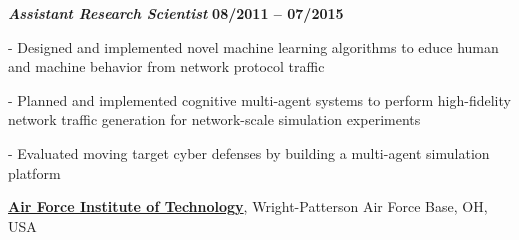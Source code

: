 \documentclass[10pt]{article}
\newcommand{\halfblankline}{\quad\vspace{-0.5\baselineskip}\pagebreak[3]}
\begin{document}
\begin{outerlist}

\item[] {\normalsize \textbf{\textit{Assistant Research Scientist}}}%
\hfill \textbf{08/2011 -- 07/2015}

\begin{innerlist}

\item[-] Designed and implemented novel machine learning algorithms to educe human and machine behavior from network protocol traffic

\item[-] Planned and implemented cognitive multi-agent systems to perform high-fidelity network traffic generation for network-scale simulation experiments

\item[-] Evaluated moving target cyber defenses by building a multi-agent simulation platform

%
%
%

%
%

\end{innerlist}
\end{outerlist}

\halfblankline

\href{http://www.ll.mit.edu/}{\textbf{Air Force Institute of Technology}},
Wright-Patterson Air Force Base, OH, USA
\end{document}

